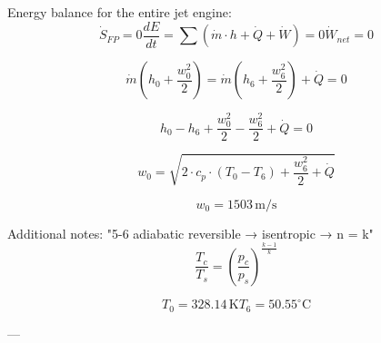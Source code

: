 Energy balance for the entire jet engine:  
\[
\dot{S}_{FP} = 0  
\frac{dE}{dt} = \sum (\dot{m} \cdot h + \dot{Q} + \dot{W}) = 0  
\dot{W}_{net} = 0  
\]

\[
\dot{m} \left( h_0 + \frac{w_0^2}{2} \right) = \dot{m} \left( h_6 + \frac{w_6^2}{2} \right) + \dot{Q} = 0  
\]

\[
h_0 - h_6 + \frac{w_0^2}{2} - \frac{w_6^2}{2} + \dot{Q} = 0  
\]

\[
w_0 = \sqrt{2 \cdot c_p \cdot (T_0 - T_6) + \frac{w_6^2}{2} + \dot{Q}}  
\]

\[
w_0 = 1503 \, \text{m/s}  
\]

Additional notes:  
"5-6 adiabatic reversible → isentropic → n = k"  
\[
\frac{T_c}{T_s} = \left( \frac{p_c}{p_s} \right)^{\frac{k-1}{k}}  
\]

\[
T_0 = 328.14 \, \text{K}  
T_6 = 50.55^\circ \text{C}  
\]

---